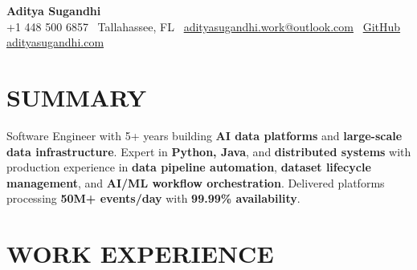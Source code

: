 \documentclass[letterpaper,10pt]{article}
\begin{document}
\begin{center}
{\huge\textbf{Aditya Sugandhi}} \\
+1 448 500 6857 \textbar\ \textcolor{metablue}{Tallahassee, FL} \textbar\
\href{mailto:adityasugandhi.work@outlook.com}{adityasugandhi.work@outlook.com} \textbar\
\href{https://github.com/adityasugandhi}{GitHub}
\textbar \href{https://adityasugandhi.com}{adityasugandhi.com}
\end{center}
\vspace{-12pt}

\section{\textcolor{metablue}{SUMMARY}}
\small
\vspace{-6pt}
Software Engineer with 5+ years building \textbf{AI data platforms} and \textbf{large-scale data infrastructure}. Expert in \textbf{Python, Java}, and \textbf{distributed systems} with production experience in \textbf{data pipeline automation}, \textbf{dataset lifecycle management}, and \textbf{AI/ML workflow orchestration}. Delivered platforms processing \textbf{50M+ events/day} with \textbf{99.99\% availability}.

\vspace{-9pt}

\section{\textcolor{metablue}{WORK EXPERIENCE}}
\vspace{-10pt}
\end{document}
